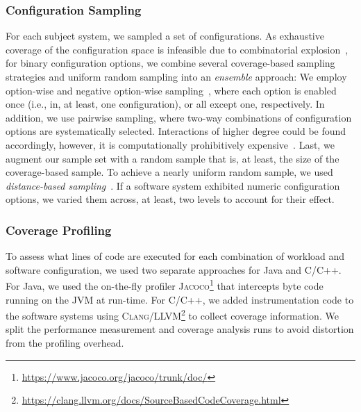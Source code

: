 {\subsubsection{Configuration Sampling}\label{sec:sampling}
For each subject system, we sampled a set of configurations. As exhaustive coverage of the configuration space is infeasible due to combinatorial explosion~\cite{henardCombining2015}, for binary configuration options, we combine several coverage-based sampling strategies and uniform random sampling into an \emph{ensemble} approach: 
We employ option-wise and negative option-wise sampling~\cite{siegmundPerformanceinfluenceModelsHighly2015}, where each option is enabled once (i.e., in, at least, one configuration), or all except one, respectively. In addition, we use pairwise sampling, where two-way combinations of configuration options are systematically selected. Interactions of higher degree could be found accordingly, however, it is computationally prohibitively expensive~\cite{henardCombining2015}. 
Last, we augment our sample set with a random sample that is, at least, the size of the coverage-based sample. To achieve a nearly uniform random sample, we used \emph{distance-based sampling}~\cite{kaltenecker_distance-based_2019}. If a software system exhibited numeric configuration options, we varied them across, at least, two levels to account for their effect. %


\subsubsection{Coverage Profiling}\label{sec:profiling}
{\color{edited}
To assess what lines of code are executed for each combination of workload and software configuration, we used two separate approaches for Java and C/C++. For Java, we used the on-the-fly profiler \textsc{Jacoco}\footnote{\url{https://www.jacoco.org/jacoco/trunk/doc/}} that intercepts byte code running on the JVM at run-time. For C/C++, we added instrumentation code to the software systems using \textsc{Clang/LLVM}\footnote{\url{https://clang.llvm.org/docs/SourceBasedCodeCoverage.html}} to collect coverage information. We split the performance measurement and coverage analysis runs to  avoid distortion from the profiling overhead.
}
	
}
